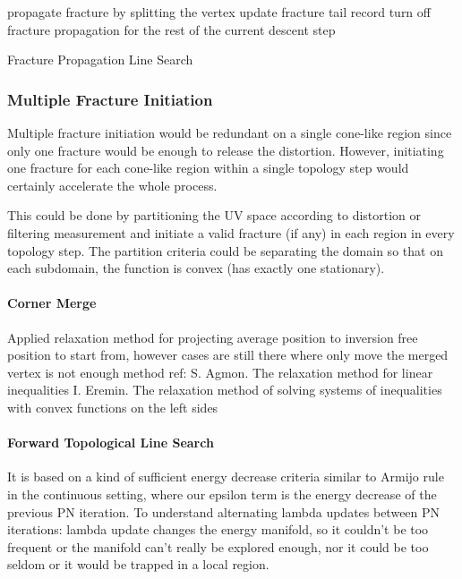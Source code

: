 \begin{algorithm}[h]
\SetAlgoLined
{}
{
  propagate fracture by splitting the vertex\;
  update fracture tail record\;
}
{
  turn off fracture propagation for the rest of the current descent step\;
}
\caption{Fracture Propagation Line Search}
\end{algorithm}



\subsubsection{Multiple Fracture Initiation}
\minchen{[TODO]}

Multiple fracture initiation would be redundant on a single cone-like region since only one fracture would be enough to release the distortion. However, initiating one fracture for each cone-like region within a single topology step would certainly accelerate the whole process.

This could be done by partitioning the UV space according to distortion or filtering measurement and initiate a valid fracture (if any) in each region in every topology step. The partition criteria could be separating the domain so that on each subdomain, the function is convex (has exactly one stationary).

\paragraph{Corner Merge} Applied relaxation method for projecting average position to inversion free position to start from, however cases are still there where only move the merged vertex is not enough
method ref:
S. Agmon. The relaxation method for linear inequalities
I. Eremin. The relaxation method of solving systems of inequalities with convex functions on the left sides

\paragraph{Forward Topological Line Search} It is based on a kind of sufficient energy decrease criteria similar to Armijo rule in the continuous setting, where our epsilon term is the energy decrease of the previous PN iteration.
To understand alternating lambda updates between PN iterations: lambda update changes the energy manifold, so it couldn’t be too frequent or the manifold can’t really be explored enough, nor it could be too seldom or it would be trapped in a local region.
